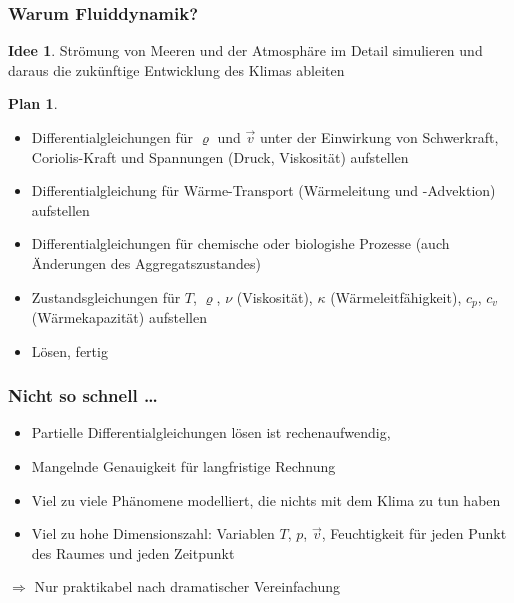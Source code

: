 %
%
%
\theoremstyle{definition}
\newtheorem{idee}{Idee}
\newtheorem{plan}{Plan}
\newtheorem{prob}{Problem}
\newtheorem{kont}{Kontinuitätsgleichung}
\newtheorem{impulserhaltung}{Impulserhaltung}
\newtheorem{ink}{Kompressibilität bewirkt}
\newtheorem{boussinesq}{Boussinesq-Approximation}
\newtheorem{rot}{Rotation}
\newtheorem{sfkt}{Strömungsfunktion}
\newtheorem{divergenz}{Divergenzfreiheit}
\newtheorem{navier}{Navier-Stokes-Gleichung}
\newtheorem{beisp}{Beispiel: Lorenz-Modell}
\newtheorem{anomalie}{Anomalie}
\newtheorem{lin}{Linearisierung}
\newtheorem{vort}{Vorticity}




%
%
\begin{frame}
\frametitle{Warum Fluiddynamik?}
\begin{idee}
Strömung von Meeren und der Atmosphäre im Detail simulieren und
daraus die zukünftige Entwicklung des Klimas ableiten
\end{idee}
\pause
\begin{plan}
\begin{itemize}[<+->]
\item
Differentialgleichungen für $\varrho$ und $\vec v$ unter der Einwirkung
von Schwerkraft, Coriolis-Kraft und Spannungen (Druck, Viskosität)
aufstellen
\item
Differentialgleichung für Wärme-Transport (Wärmeleitung und -Advektion)
aufstellen
\item
Differentialgleichungen für chemische oder biologishe Prozesse
(auch Änderungen des Aggregatszustandes)
\item
Zustandsgleichungen für $T$, $\varrho$, $\nu$ (Viskosität),
$\kappa$ (Wärmeleitfähigkeit), $c_p$, $c_v$ (Wärmekapazität)
aufstellen
\item
Lösen, fertig \smiley{}
\end{itemize}
\end{plan}

\end{frame}

%
%
\begin{frame}
\frametitle{Nicht so schnell \dots}
\begin{itemize}[<+->]
\item
Partielle Differentialgleichungen lösen ist rechenaufwendig,
\item
Mangelnde Genauigkeit für langfristige Rechnung
\item
Viel zu viele Phänomene modelliert, die nichts mit dem Klima zu tun haben
\item
Viel zu hohe Dimensionszahl: Variablen $T$, $p$, $\vec v$, Feuchtigkeit
für jeden Punkt des Raumes und jeden Zeitpunkt
\end{itemize}
\pause
$\Rightarrow$ Nur praktikabel nach dramatischer Vereinfachung
\end{frame}

